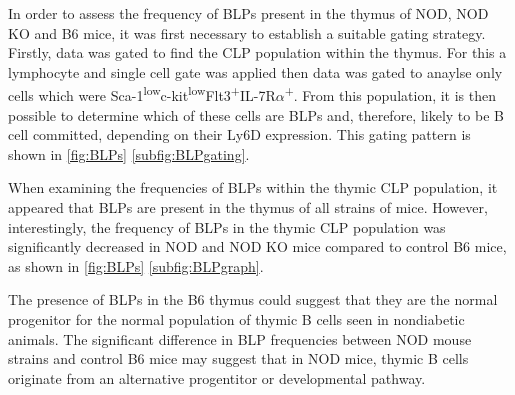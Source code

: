 




In order to assess the frequency of BLPs present in the thymus of NOD, NOD KO and B6 mice, it was first necessary to establish a suitable gating strategy.
Firstly, data was gated to find the CLP population within the thymus.
For this a lymphocyte and single cell gate was applied then data was gated to anaylse only cells which were Sca-1\textsuperscript{low}c-kit\textsuperscript{low}Flt3\textsuperscript{+}IL-7R$\alpha$\textsuperscript{+}.
From this population, it is then possible to determine which of these cells are BLPs and, therefore, likely to be B cell committed, depending on their Ly6D expression.
This gating pattern is shown in \cref{fig:BLPs} \ref{subfig:BLPgating}.

When examining the frequencies of BLPs within the thymic CLP population, it appeared that BLPs are present in the thymus of all strains of mice.
However, interestingly, the frequency of BLPs in the thymic CLP population was significantly decreased in NOD and NOD KO mice compared to control B6 mice, as shown in \cref{fig:BLPs} \ref{subfig:BLPgraph}.

The presence of BLPs in the B6 thymus could suggest that they are the normal progenitor for the normal population of thymic B cells seen in nondiabetic animals.
The significant difference in BLP frequencies between NOD mouse strains and control B6 mice may suggest that in NOD mice, thymic B cells originate from an alternative progentitor or developmental pathway.


